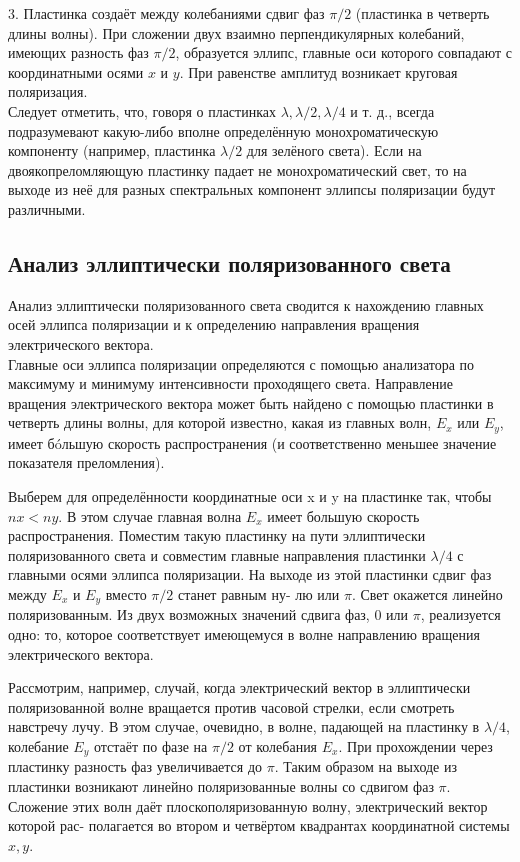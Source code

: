 \documentclass[a4paper]{article}
\begin{document}
3.  Пластинка создаёт между колебаниями сдвиг фаз $ \pi/2 $ (пластинка
в четверть длины волны). При сложении двух взаимно перпендикулярных колебаний, имеющих разность фаз $ \pi/2 $, образуется эллипс, главные оси которого совпадают с координатными осями $ x $ и $ y $. При равенстве амплитуд возникает круговая поляризация.\\
Следует отметить, что, говоря о пластинках $ \lambda , \lambda/2, \lambda/4  $ и т. д., всегда подразумевают какую-либо вполне определённую монохроматическую
компоненту (например, пластинка $ \lambda/2 $ для зелёного света). Если на двоякопреломляющую пластинку падает не монохроматический свет, то на
выходе из неё для разных спектральных компонент эллипсы поляризации будут различными.\\
\subsection{Анализ эллиптически поляризованного света}

Анализ эллиптически поляризованного света сводится к нахождению главных осей
эллипса поляризации и к определению направления вращения электрического вектора.\\

Главные оси эллипса поляризации определяются с помощью анализатора по максимуму и минимуму интенсивности проходящего света.
Направление вращения электрического вектора может быть найдено
с помощью пластинки в четверть длины волны, для которой известно,
какая из главных волн, $ E_x $ или $ E_y $, имеет б\'{o}льшую скорость распространения (и соответственно меньшее значение показателя преломления).

Выберем для определённости координатные оси x и y на пластинке
так, чтобы $ nx < ny $. В этом случае главная волна $ E_x $ имеет большую
скорость распространения. Поместим такую пластинку на пути эллиптически поляризованного света и совместим главные направления пластинки $ \lambda/4 $ с главными осями эллипса поляризации. На выходе из этой
пластинки сдвиг фаз между $ E_x $ и $ E_y $ вместо $ \pi/2 $ станет равным ну-
лю или $ \pi $. Свет окажется линейно поляризованным. Из двух возможных значений сдвига фаз, 0 или $ \pi $, реализуется одно: то, которое соответствует имеющемуся в волне направлению вращения электрического вектора.

Рассмотрим, например, случай, когда электрический вектор в эллиптически поляризованной волне вращается против часовой стрелки,
если смотреть навстречу лучу. В этом случае, очевидно, в волне, падающей на пластинку в $ \lambda/4 $, колебание $ E_y $ отстаёт по фазе на $ \pi/2 $ от
колебания $ E_x $. При прохождении через пластинку разность фаз увеличивается до $ \pi $. Таким образом на выходе из пластинки возникают линейно поляризованные волны со сдвигом фаз $ \pi $. Сложение этих волн
даёт плоскополяризованную волну, электрический вектор которой рас-
полагается во втором и четвёртом квадрантах координатной системы
$ x, y $.
\end{document}
